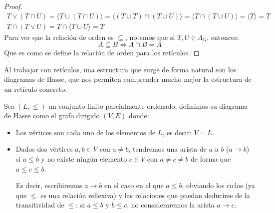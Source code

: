\begin{prop}
\begin{proof}
        \begin{gather*}
            T\lor (T\cap U) = \langle T\cup (T\cap U) \rangle = \langle (T\cup T) \cap (T\cup U) \rangle  = \langle T\cap (T\cup U) \rangle = \langle T \rangle  = T \\
            T\cap (T\lor U) = T\cap \langle T\cup U \rangle = T
        \end{gather*}
        Para ver que la relación de orden es $\subseteq $, notemos que si $T,U\in \Lambda_G$, entonces:
        \begin{equation*}
            A\subseteq B \Longleftrightarrow A \cap B = A
        \end{equation*}
        Que es como se define la relación de orden para los retículos.
    \end{proof}
\end{prop}

Al trabajar con retículos, una estructura que surge de forma natural son los diagramas de Hasse, que nos permiten comprender mucho mejor la estructura de un retículo concreto.

\begin{definicion}
    Sea $(L,\leq)$ un conjunto finito parcialmente ordenado, definimos su diagrama de Hasse como el grafo dirigido $(V, E)$ donde:
    \begin{itemize}
        \item Los vértices son cada uno de los elementos de $L$, es decir: $V = L$.
        \item Dados dos vértices $a,b\in V$ con $a\neq b$, tendremos una arista de $a$ a $b$ ($a\to b$) si $a\leq b$ y no existe ningún elemento $c\in V$ con $a\neq c\neq b$ de forma que $a\leq c\leq b$.

            Es decir, escribiremos $a\to b$ en el caso en el que $a\leq b$, obviando los ciclos (ya que $\leq$ es una relación reflexiva) y las relaciones que puedan deducirse de la transitividad de $\leq$: si $a\leq b$ y $b\leq c$, no consideraremos la arista $a\to c$.
    \end{itemize}
\end{definicion}

